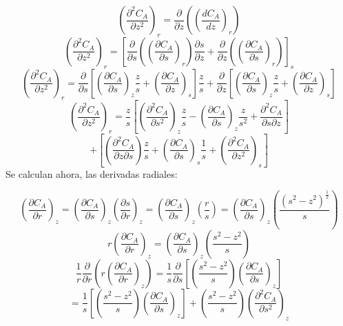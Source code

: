 \begin{equation*}
    (\frac{\partial^2C_A}{\partial z^2})_r=\frac{\partial}{\partial z}((\frac{dC_A}{dz})_r)
\end{equation*}
\begin{equation*}
    (\frac{\partial^2C_A}{\partial z^2})_r=[\frac{\partial}{\partial s}((\frac{\partial C_A}{\partial s})_r)\frac{\partial s}{\partial z}+\frac{\partial }{\partial z}((\frac{\partial C_A}{\partial s})_r)]_s
\end{equation*}
\begin{equation*}
    (\frac{\partial^2C_A}{\partial z^2})_r=\frac{\partial}{\partial s}[(\frac{\partial C_A}{\partial s})_z\frac{z}{s}+(\frac{\partial C_A}{\partial z})_s]\frac{z}{s}+\frac{\partial }{\partial z}[(\frac{\partial C_A}{\partial s})_z\frac{z}{s}+(\frac{\partial C_A}{\partial z})_s]
\end{equation*}
\begin{equation*}
    (\frac{\partial^2C_A}{\partial z^2})_r=\frac{z}{s}[(\frac{\partial^2 C_A}{\partial s^2})_z\frac{z}{s}-(\frac{\partial C_A}{\partial s})_z\frac{z}{s^2}+\frac{\partial^2C_A}{\partial s \partial z}]
\end{equation*}
\begin{equation*}
    +[(\frac{\partial^2C_A}{\partial z \partial s})\frac{z}{s}+(\frac{\partial C_A}{\partial s})_s\frac{1}{s}+(\frac{\partial^2C_A}{\partial z^2})_s]
\end{equation*}
Se calculan ahora, las derivadas radiales:

\begin{equation*}
    (\frac{\partial C_A}{\partial r})_z=(\frac{\partial C_A}{\partial s})_z(\frac{\partial s}{\partial r})_z=(\frac{\partial C_A}{\partial s})_z(\frac{r}{s})=(\frac{\partial C_A}{\partial s})_z(\frac{(s^2-z^2)^\frac{1}{2}}{s})
\end{equation*}
\begin{equation*}
     r(\frac{\partial C_A}{\partial r})_z=(\frac{\partial C_A}{\partial s})_z(\frac{s^2-z^2}{s})
\end{equation*}
\begin{equation*}
    \frac{1}{r}\frac{\partial}{\partial r}(r(\frac{\partial C_A}{\partial r})_z)=\frac{1}{s}\frac{\partial}{\partial s}[(\frac{s^2-z^2}{s})(\frac{\partial C_A}{\partial s})_z]
\end{equation*}
\begin{equation*}
    =\frac{1}{s}[(\frac{s^2-z^2}{s})(\frac{\partial C_A}{\partial s})_z]+(\frac{s^2-z^2}{s})(\frac{\partial^2C_A}{\partial s^2})_z
\end{equation*}

